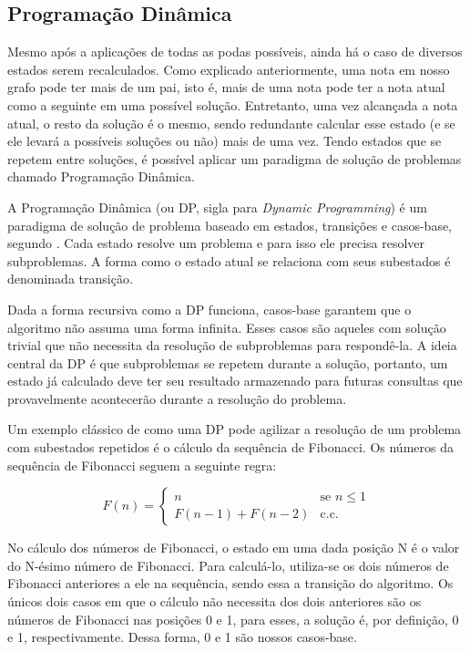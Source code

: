     \subsection[Programação Dinâmica]{Programação Dinâmica}

      Mesmo após a aplicações de todas as podas possíveis, ainda há o caso de diversos estados serem recalculados. Como explicado anteriormente, uma nota em nosso grafo pode ter mais de um pai, isto é, mais de uma nota pode ter a nota atual como a seguinte em uma possível solução. Entretanto, uma vez alcançada a nota atual, o resto da solução é o mesmo, sendo redundante calcular esse estado (e se ele levará a possíveis soluções ou não) mais de uma vez. Tendo estados que se repetem entre soluções, é possível aplicar um paradigma de solução de problemas chamado Programação Dinâmica.

      A Programação Dinâmica (ou DP, sigla para \textit{Dynamic Programming}) é um paradigma de solução de problema baseado em estados, transições e casos-base, segundo . Cada estado resolve um problema e para isso ele precisa resolver subproblemas. A forma como o estado atual se relaciona com seus subestados é denominada transição.

      Dada a forma recursiva como a DP funciona, casos-base garantem que o algoritmo não assuma uma forma infinita. Esses casos são aqueles com solução trivial que não necessita da resolução de subproblemas para respondê-la. A ideia central da DP é que subproblemas se repetem durante a solução, portanto, um estado já calculado deve ter seu resultado armazenado para futuras consultas que provavelmente acontecerão durante a resolução do problema.

      Um exemplo clássico de como uma DP pode agilizar a resolução de um problema com subestados repetidos é o cálculo da sequência de Fibonacci. Os números da sequência de Fibonacci seguem a seguinte regra:

      \[ F(n) = \left\{ \begin{array}{ll}
         n & \mbox{se $n \leqslant 1$}\\
        F(n-1) + F(n-2) & \mbox{c.c.}\end{array} \right. \]

      No cálculo dos números de Fibonacci, o estado em uma dada posição N é o valor do N-ésimo número de Fibonacci. Para calculá-lo, utiliza-se os dois números de Fibonacci anteriores a ele na sequência, sendo essa a transição do algoritmo. Os únicos dois casos em que o cálculo não necessita dos dois anteriores são os números de Fibonacci nas posições 0 e 1, para esses, a solução é, por definição, 0 e 1, respectivamente. Dessa forma, 0 e 1 são nossos casos-base.


